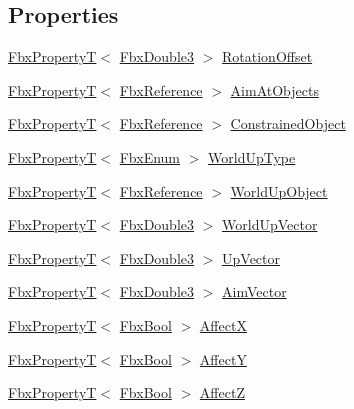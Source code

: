 \subsection*{Properties}
\begin{DoxyCompactItemize}
\item 
\hyperlink{class_fbx_property_t}{Fbx\+PropertyT}$<$ \hyperlink{fbxtypes_8h_ae0a96f14cde566774c7553aa7523b7a7}{Fbx\+Double3} $>$ \hyperlink{class_fbx_constraint_aim_a2eff91c699e2dd2391f650a5659f1e5e}{Rotation\+Offset}
\item 
\hyperlink{class_fbx_property_t}{Fbx\+PropertyT}$<$ \hyperlink{fbxtypes_8h_a44df6a2eec915cf27cd481e5c5e48a24}{Fbx\+Reference} $>$ \hyperlink{class_fbx_constraint_aim_a502a01a00e7756b82d697e881fb21504}{Aim\+At\+Objects}
\item 
\hyperlink{class_fbx_property_t}{Fbx\+PropertyT}$<$ \hyperlink{fbxtypes_8h_a44df6a2eec915cf27cd481e5c5e48a24}{Fbx\+Reference} $>$ \hyperlink{class_fbx_constraint_aim_ae1e8704e4e04529a254e91080a2a19c1}{Constrained\+Object}
\item 
\hyperlink{class_fbx_property_t}{Fbx\+PropertyT}$<$ \hyperlink{fbxtypes_8h_a9a28614cb4272a0ad7d748eda7f3d3e5}{Fbx\+Enum} $>$ \hyperlink{class_fbx_constraint_aim_a01c3d71386a124da25186e795dd29956}{World\+Up\+Type}
\item 
\hyperlink{class_fbx_property_t}{Fbx\+PropertyT}$<$ \hyperlink{fbxtypes_8h_a44df6a2eec915cf27cd481e5c5e48a24}{Fbx\+Reference} $>$ \hyperlink{class_fbx_constraint_aim_a9e0b0e5bff9ccd9e0774f2f59d484b7b}{World\+Up\+Object}
\item 
\hyperlink{class_fbx_property_t}{Fbx\+PropertyT}$<$ \hyperlink{fbxtypes_8h_ae0a96f14cde566774c7553aa7523b7a7}{Fbx\+Double3} $>$ \hyperlink{class_fbx_constraint_aim_ae1d68f2cf7730299bbf63c55b52cb540}{World\+Up\+Vector}
\item 
\hyperlink{class_fbx_property_t}{Fbx\+PropertyT}$<$ \hyperlink{fbxtypes_8h_ae0a96f14cde566774c7553aa7523b7a7}{Fbx\+Double3} $>$ \hyperlink{class_fbx_constraint_aim_a6c92f45b498fd1f214cde79f84ffc9c7}{Up\+Vector}
\item 
\hyperlink{class_fbx_property_t}{Fbx\+PropertyT}$<$ \hyperlink{fbxtypes_8h_ae0a96f14cde566774c7553aa7523b7a7}{Fbx\+Double3} $>$ \hyperlink{class_fbx_constraint_aim_a7d4ef157e40e8bcb8f1cb3f12f8f9b01}{Aim\+Vector}
\item 
\hyperlink{class_fbx_property_t}{Fbx\+PropertyT}$<$ \hyperlink{fbxtypes_8h_a92e0562b2fe33e76a242f498b362262e}{Fbx\+Bool} $>$ \hyperlink{class_fbx_constraint_aim_a93257a107d3b178be6af8a221cf1b819}{AffectX}
\item 
\hyperlink{class_fbx_property_t}{Fbx\+PropertyT}$<$ \hyperlink{fbxtypes_8h_a92e0562b2fe33e76a242f498b362262e}{Fbx\+Bool} $>$ \hyperlink{class_fbx_constraint_aim_af3de7ec97229a3b7e63d23a3d9daaa98}{AffectY}
\item 
\hyperlink{class_fbx_property_t}{Fbx\+PropertyT}$<$ \hyperlink{fbxtypes_8h_a92e0562b2fe33e76a242f498b362262e}{Fbx\+Bool} $>$ \hyperlink{class_fbx_constraint_aim_ae376b28fe860f28e13a92c8ce727363c}{AffectZ}
\end{DoxyCompactItemize}
